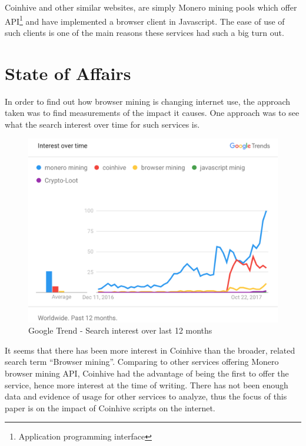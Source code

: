 Coinhive and other similar websites, are simply Monero mining pools which offer API\footnote{Application programming interface} and have implemented a browser client in Javascript. The ease of use of such clients is one of the main reasons these services had such a big turn out. 



\section{State of Affairs}


In order to find out how browser mining is changing internet use, the approach taken was to find measurements of the impact it causes. One approach was to see what the search interest over time for such services is. 

\begin{figure}[t]
\centering
\includegraphics[width=\linewidth]{figures/usage_over_time2.png}
\caption{Google Trend - Search interest over last 12 months}
\end{figure}

It seems that there has been more interest in Coinhive than the broader, related search term ``Browser mining''. Comparing to other services offering Monero browser mining API, Coinhive had the advantage of being the first to offer the service, hence more interest at the time of writing. There has not been enough data and evidence of usage for other services to analyze, thus the focus of this paper is on the impact of Coinhive scripts on the internet. 

